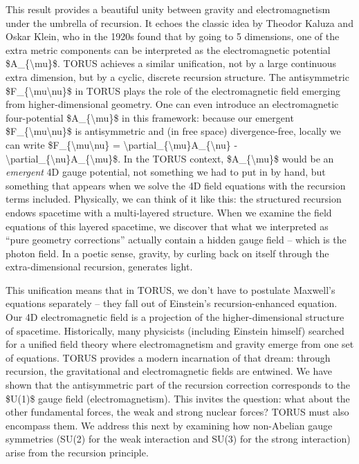 \documentclass[]{article}
\begin{document}
This result provides a beautiful unity between gravity and
electromagnetism under the umbrella of recursion. It echoes the classic
idea by Theodor Kaluza and Oskar Klein, who in the 1920s found that by
going to 5 dimensions, one of the extra metric components can be
interpreted as the electromagnetic potential
\$A\_\{\textbackslash{}mu\}\$. TORUS achieves a similar unification, not
by a large continuous extra dimension, but by a cyclic, discrete
recursion structure. The antisymmetric
\$F\_\{\textbackslash{}mu\textbackslash{}nu\}\$ in TORUS plays the role
of the electromagnetic field emerging from higher-dimensional geometry.
One can even introduce an electromagnetic four-potential
\$A\_\{\textbackslash{}mu\}\$ in this framework: because our emergent
\$F\_\{\textbackslash{}mu\textbackslash{}nu\}\$ is antisymmetric and (in
free space) divergence-free, locally we can write
\$F\_\{\textbackslash{}mu\textbackslash{}nu\} =
\textbackslash{}partial\_\{\textbackslash{}mu\}A\_\{\textbackslash{}nu\}
-
\textbackslash{}partial\_\{\textbackslash{}nu\}A\_\{\textbackslash{}mu\}\$.
In the TORUS context, \$A\_\{\textbackslash{}mu\}\$ would be an
\emph{emergent} 4D gauge potential, not something we had to put in by
hand, but something that appears when we solve the 4D field equations
with the recursion terms included. Physically, we can think of it like
this: the structured recursion endows spacetime with a multi-layered
structure. When we examine the field equations of this layered
spacetime, we discover that what we interpreted as ``pure geometry
corrections'' actually contain a hidden gauge field -- which is the
photon field. In a poetic sense, gravity, by curling back on itself
through the extra-dimensional recursion, generates light.

This unification means that in TORUS, we don't have to postulate
Maxwell's equations separately -- they fall out of Einstein's
recursion-enhanced equation. Our 4D electromagnetic field is a
projection of the higher-dimensional structure of spacetime.
Historically, many physicists (including Einstein himself) searched for
a unified field theory where electromagnetism and gravity emerge from
one set of equations. TORUS provides a modern incarnation of that dream:
through recursion, the gravitational and electromagnetic fields are
entwined. We have shown that the antisymmetric part of the recursion
correction corresponds to the \$U(1)\$ gauge field (electromagnetism).
This invites the question: what about the other fundamental forces, the
weak and strong nuclear forces? TORUS must also encompass them. We
address this next by examining how non-Abelian gauge symmetries (SU(2)
for the weak interaction and SU(3) for the strong interaction) arise
from the recursion principle.
\end{document}
